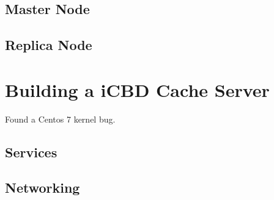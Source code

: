 \subsection{Master Node}
\label{sub:rep_master_node}


\subsection{Replica Node}
\label{sub:rep_replica_node}






\section{Building a iCBD Cache Server}
\label{sec:cache_server}

Found a Centos 7 kernel bug.


\subsection{Services}
\label{sub:cache_services}


\subsection{Networking}
\label{sub:cache_networking}



